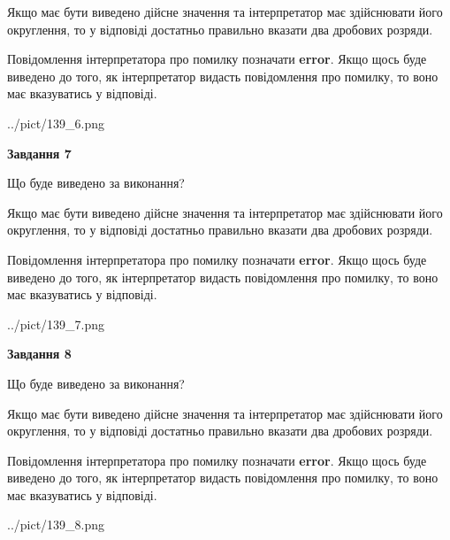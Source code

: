 \documentclass[12pt, ukrainian]{article}
\begin{document}
{\begin {Large}
Якщо має бути виведено дійсне значення та інтерпретатор має здійснювати його округлення, 
то у відповіді достатньо правильно вказати два дробових розряди.

Повідомлення інтерпретатора про помилку позначати \textbf{error}.
Якщо щось буде виведено до того, як інтерпретатор видасть повідомлення про помилку, 
то воно має вказуватись у відповіді. \par

\begin{center}
	{../pict/139_6.png}
\end{center}
\newpage

{\begin {center}\textbf{Завдання 7}\end {center}}\par
Що буде виведено за виконання? \par

Якщо має бути виведено дійсне значення та інтерпретатор має здійснювати його округлення, 
то у відповіді достатньо правильно вказати два дробових розряди.

Повідомлення інтерпретатора про помилку позначати \textbf{error}.
Якщо щось буде виведено до того, як інтерпретатор видасть повідомлення про помилку, 
то воно має вказуватись у відповіді. \par

\begin{center}
	{../pict/139_7.png}
\end{center}
\newpage

{\begin {center}\textbf{Завдання 8}\end {center}}\par
Що буде виведено за виконання? \par

Якщо має бути виведено дійсне значення та інтерпретатор має здійснювати його округлення, 
то у відповіді достатньо правильно вказати два дробових розряди.

Повідомлення інтерпретатора про помилку позначати \textbf{error}.
Якщо щось буде виведено до того, як інтерпретатор видасть повідомлення про помилку, 
то воно має вказуватись у відповіді. \par

\begin{center}
	{../pict/139_8.png}
\end{center}
\newpage


\end{Large}}
\end{document}
